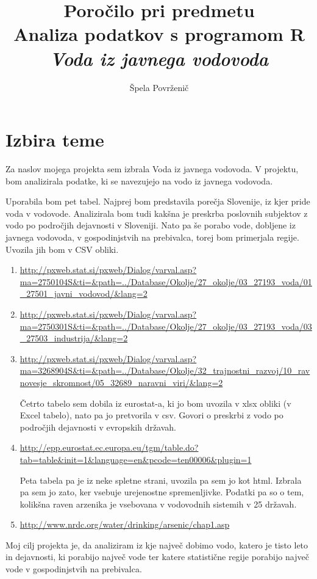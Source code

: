 \documentclass[11pt,a4paper]{article}
\begin{document}
\title{Poročilo pri predmetu \\
Analiza podatkov s programom R\\
\vspace{15mm}
\textbf{\emph{Voda iz javnega vodovoda}}}
\author{Špela Povrženič}
\maketitle


\newpage
\section{Izbira teme}
Za naslov mojega projekta sem izbrala Voda iz javnega vodovoda.
V projektu, bom analizirala podatke, ki se navezujejo na vodo iz javnega vodovoda. 

Uporabila bom pet tabel. 
Najprej bom predstavila porečja Slovenije, iz kjer pride voda v vodovode. Analizirala bom tudi kakšna je preskrba poslovnih subjektov z vodo po področjih dejavnosti v Sloveniji. Nato pa še porabo vode, dobljene iz javnega vodovoda, v gospodinjstvih na prebivalca, torej bom primerjala regije. Uvozila jih bom v CSV obliki.

\begin{enumerate} 
\item{\url{http://pxweb.stat.si/pxweb/Dialog/varval.asp?ma=2750104S&ti=&path=../Database/Okolje/27_okolje/03_27193_voda/01_27501_javni_vodovod/&lang=2}}

\item{\url{http://pxweb.stat.si/pxweb/Dialog/varval.asp?ma=2750301S&ti=&path=../Database/Okolje/27_okolje/03_27193_voda/03_27503_industrija/&lang=2}}

\item{\url{http://pxweb.stat.si/pxweb/Dialog/varval.asp?ma=3268904S&ti=&path=../Database/Okolje/32_trajnostni_razvoj/10_ravnovesje_skromnost/05_32689_naravni_viri/&lang=2}}

Četrto tabelo sem dobila iz eurostat-a, ki jo bom uvozila v xlsx obliki (v Excel tabelo), nato pa jo pretvorila v csv. Govori o preskrbi z vodo po področjih dejavnosti v evropskih državah.

\item{\url{http://epp.eurostat.ec.europa.eu/tgm/table.do?tab=table&init=1&language=en&pcode=ten00006&plugin=1}}

Peta tabela pa je iz neke spletne strani, uvozila pa sem jo kot html. Izbrala pa sem jo zato, ker vsebuje urejenostne spremenljivke. Podatki pa so o tem, kolikšna raven arzenika je vsebovana v vodovodnih sistemih v 25 državah.

\item{\url{http://www.nrdc.org/water/drinking/arsenic/chap1.asp}}
\end{enumerate}
Moj cilj projekta je, da analiziram iz kje največ dobimo vodo, katero je tisto leto in  dejavnosti, ki porabijo največ vode ter katere statistične regije porabijo največ vode v gospodinjstvih na prebivalca. 
\end{document}
